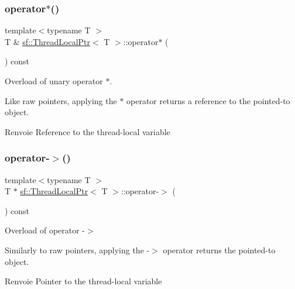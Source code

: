 \subsubsection{\texorpdfstring{operator$\ast$()}{operator*()}}
{\footnotesize\ttfamily template$<$typename T $>$ \\
T \& \hyperlink{classsf_1_1ThreadLocalPtr}{sf\+::\+Thread\+Local\+Ptr}$<$ T $>$\+::operator$\ast$ (\begin{DoxyParamCaption}{ }\end{DoxyParamCaption}) const}



Overload of unary operator $\ast$. 

Like raw pointers, applying the $\ast$ operator returns a reference to the pointed-\/to object.

\begin{DoxyReturn}{Renvoie}
Reference to the thread-\/local variable 
\end{DoxyReturn}
\mbox{\label{classsf_1_1ThreadLocalPtr_a25646e1014a933d1a45b9ce17bab7703}} 
\subsubsection{\texorpdfstring{operator-\/$>$()}{operator->()}}
{\footnotesize\ttfamily template$<$typename T $>$ \\
T $\ast$ \hyperlink{classsf_1_1ThreadLocalPtr}{sf\+::\+Thread\+Local\+Ptr}$<$ T $>$\+::operator-\/$>$ (\begin{DoxyParamCaption}{ }\end{DoxyParamCaption}) const}



Overload of operator -\/$>$ 

Similarly to raw pointers, applying the -\/$>$ operator returns the pointed-\/to object.

\begin{DoxyReturn}{Renvoie}
Pointer to the thread-\/local variable 
\end{DoxyReturn}
\mbox{\label{classsf_1_1ThreadLocalPtr_a14dcf1cdf5f6b3bcdd633014b2b671f5}} 
